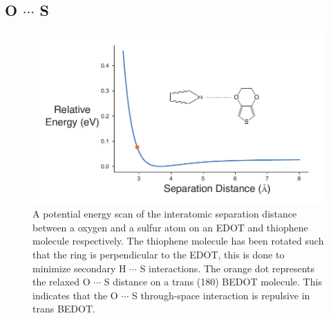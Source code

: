 \subsection{\texorpdfstring{O $\cdots$ S}{OS}}
\begin{figure}[hbt!]
    \centering
    \includegraphics{figures/append_aroma/ts_t_edot_copy.pdf}
    \caption[\texorpdfstring{O $\cdots$ S}{OS} Through-space Calculation]{A potential energy scan of the interatomic separation distance between a oxygen and a sulfur atom on an EDOT and thiophene molecule respectively. The thiophene molecule has been rotated such that the ring is perpendicular to the EDOT, this is done to minimize secondary H $\cdots$ S interactions. The orange dot represents the relaxed O $\cdots$ S distance on a trans (180\textdegree) BEDOT molecule. This indicates that the O $\cdots$ S through-space interaction is repulsive in trans BEDOT.}
    \label{fig:ts_t_edot}
\end{figure}
\clearpage


